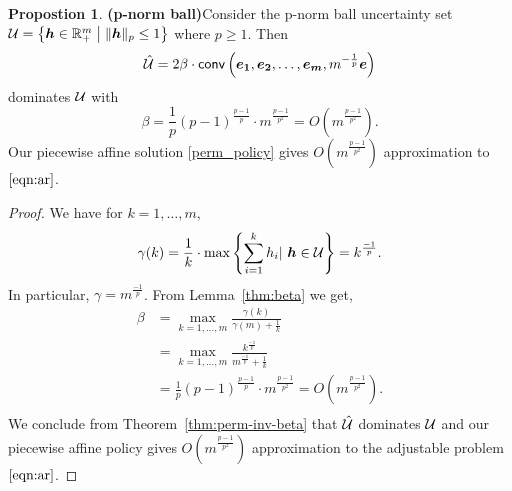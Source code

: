 \documentclass[11pt]{article}
\theoremstyle{plain}
\theoremstyle{definition}
\newtheorem{prop}[theorem]{Propostion}
\numberwithin{equation}{section}%
\numberwithin{equation}{section}%
\newcommand{\mb}[1]{\ensuremath{\boldsymbol{#1}}}
\begin{document}
\begin{prop} {\bf{(p-norm ball)}}\label{prop:p-ball} Consider the p-norm ball uncertainty set $ {\cal U}= \left\{ \mb h \in \mathbb R^{m}_+ \;  \big\vert \; \| \mb h\| _p \leq 1 \right\}$ where $p \geq 1 $. Then
$$ \hat{ \cal U} = 2 \beta \cdot {\sf{conv}} \left( \mb{e_1}, \mb{e_2},\ldots, \mb{e_m},m^{-\frac{1}{p}} \mb e \right) $$
dominates ${\cal U}$ with
\[ \beta = \frac{1}{p}   (p-1)^{\frac{p-1}{p}}             \cdot m^{\frac{p-1}{p^2}} = O (  m^{\frac{p-1}{p^2}} ).\]
Our piecewise affine solution \eqref{perm_policy} gives $O  ( m^{\frac{p-1}{p^2}} )$ approximation to $\eqref{eqn:ar}$.
\end{prop}
\begin{proof}
We have for $k=1,\ldots,m$,
$$ \gamma(k)   = \frac{1}{k} \cdot \max \left\{ \sum_{i=1}^k h_i \vert\ \mb h \in {\cal U} \right\} = k^{\frac{-1}{p}}.$$
In particular, $\gamma =m^{\frac{-1}{p}}$. From Lemma~\ref{thm:beta} we get,
\begin{align*}
\beta  &= \max _{ k=1,\ldots,m}  \frac{\gamma(k)}{\gamma (m) +\frac{1}{k}} \\
& = \max _{ k=1,\ldots,m}  \frac{k^{\frac{-1}{p}}}{m^{\frac{-1}{p}} +\frac{1}{k}} \\
&= \frac{1}{p}   (p-1)^{\frac{p-1}{p}}             \cdot m^{\frac{p-1}{p^2}} = O \left(  m^{\frac{p-1}{p^2}} \right). \\
\end{align*}
We conclude from  Theorem~\ref{thm:perm-inv-beta} that $\hat{\cal U}$ dominates ${\cal U}$ and our piecewise affine policy gives $O (  m^{\frac{p-1}{p^2}} )$  approximation to the adjustable problem $\eqref{eqn:ar}$.
 \end{proof}
\end{document}
